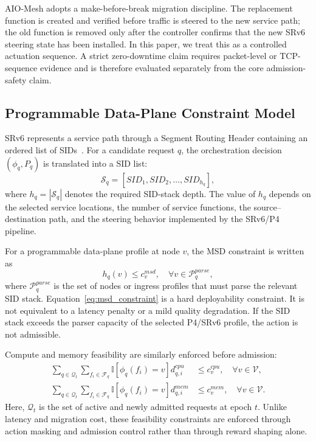 \documentclass[final,5p]{elsarticle}
\begin{document}
AIO-Mesh adopts a make-before-break migration discipline. The replacement function is created and verified before traffic is steered to the new service path; the old function is removed only after the controller confirms that the new SRv6 steering state has been installed. In this paper, we treat this as a controlled actuation sequence. A strict zero-downtime claim requires packet-level or TCP-sequence evidence and is therefore evaluated separately from the core admission-safety claim.

\subsection{Programmable Data-Plane Constraint Model}
\label{subsec:hardware_constraint_model}

SRv6 represents a service path through a Segment Routing Header containing an ordered list of SIDs~\cite{filsfils2015segment,rfc8986,rfc9352}. For a candidate request \(q\), the orchestration decision \((\phi_q, P_q)\) is translated into a SID list:
\begin{equation}
    \mathcal{S}_q = \left[SID_1, SID_2, \ldots, SID_{h_q}\right],
\end{equation}
where \(h_q = |\mathcal{S}_q|\) denotes the required SID-stack depth. The value of \(h_q\) depends on the selected service locations, the number of service functions, the source--destination path, and the steering behavior implemented by the SRv6/P4 pipeline.

For a programmable data-plane profile at node \(v\), the MSD constraint is written as
\begin{equation}
    h_q(v) \leq c_v^{msd}, \quad \forall v \in \mathcal{P}^{parse}_q,
    \label{eq:msd_constraint}
\end{equation}
where \(\mathcal{P}^{parse}_q\) is the set of nodes or ingress profiles that must parse the relevant SID stack. Equation~\eqref{eq:msd_constraint} is a hard deployability constraint. It is not equivalent to a latency penalty or a mild quality degradation. If the SID stack exceeds the parser capacity of the selected P4/SRv6 profile, the action is not admissible.

Compute and memory feasibility are similarly enforced before admission:
\begin{align}
    \sum_{q \in \mathcal{Q}_t} \sum_{f_i \in \mathcal{F}_q}
    \mathbb{I}\left[\phi_q(f_i)=v\right] d_{q,i}^{cpu}
    &\leq c_v^{cpu}, \quad \forall v \in \mathcal{V}, \\
    \sum_{q \in \mathcal{Q}_t} \sum_{f_i \in \mathcal{F}_q}
    \mathbb{I}\left[\phi_q(f_i)=v\right] d_{q,i}^{mem}
    &\leq c_v^{mem}, \quad \forall v \in \mathcal{V}.
\end{align}
Here, \(\mathcal{Q}_t\) is the set of active and newly admitted requests at epoch \(t\). Unlike latency and migration cost, these feasibility constraints are enforced through action masking and admission control rather than through reward shaping alone.
\end{document}
